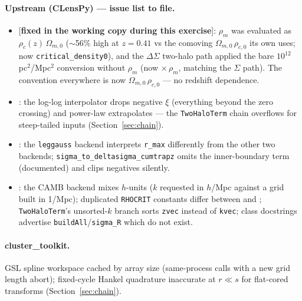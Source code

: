 \paragraph{Upstream (CLensPy) --- issue list to file.}
\begin{itemize}
\item {} [\textbf{fixed in the working copy
  during this exercise}]: $\rho_m$ was evaluated as
  $\rho_c(z)\,\Omega_{m,0}$ ($\sim$56\% high at $z = 0.41$ vs the
  comoving $\Omega_{m,0}\,\rho_{c,0}$ its own  uses; now
  \texttt{critical\_density0}), and the $\Delta\Sigma$ two-halo path
  applied the bare $10^{12}$ pc$^2$/Mpc$^2$ conversion without
  $\rho_m$ (now $\times\,\rho_m$, matching the $\Sigma$ path). The
  convention everywhere is now $\Omega_{m,0}\,\rho_{c,0}$ ---
  no redshift dependence.
\item {}: the log-log interpolator drops
  negative $\xi$ (everything beyond the zero crossing) and power-law
  extrapolates --- the \texttt{TwoHaloTerm} chain overflows for
  steep-tailed inputs (Section~\ref{sec:chain}).
\item {}: the \texttt{leggauss} backend
  interprets \texttt{r\_max} differently from the other two backends;
  \texttt{sigma\_to\_deltasigma\_cumtrapz} omits the inner-boundary
  term (documented) and clips negatives silently.
\item {}: the CAMB backend mixes $h$-units
  ($k$ requested in $h$/Mpc against a grid built in 1/Mpc); duplicated
  \texttt{RHOCRIT} constants differ between  and
  ; \texttt{TwoHaloTerm}'s unsorted-$k$ branch sorts
  \texttt{zvec} instead of \texttt{kvec}; class docstrings advertise
  \texttt{buildAll}/\texttt{sigma\_R} which do not exist.
\end{itemize}

\paragraph{cluster\_toolkit.}
GSL spline workspace cached by array size (same-process calls with a
new grid length abort); fixed-cycle Hankel quadrature inaccurate at
$r \ll s$ for flat-cored transforms (Section~\ref{sec:chain}).
